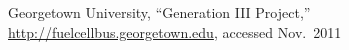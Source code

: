 Georgetown University, ``Generation III Project,'' \url{http://fuelcellbus.georgetown.edu}, accessed Nov.\ 2011%
